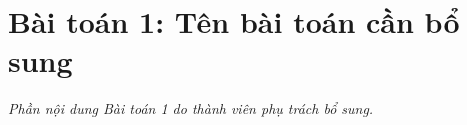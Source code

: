 \section{Bài toán 1: Tên bài toán cần bổ sung}
\label{sec:task1}
\textit{Phần nội dung Bài toán 1 do thành viên phụ trách bổ sung.}
